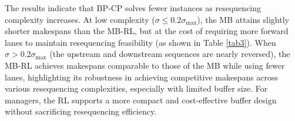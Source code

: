 \documentclass[12pt]{article}
\begin{document}
The results indicate that BP-CP solves fewer instances as resequencing complexity increases. At low complexity ($\sigma\leqslant 0.2\sigma_{\text{max}}$), the MB attains slightly shorter makespans than the MB-RL, but at the cost of requiring more forward lanes to maintain resequencing feasibility (as shown in Table \ref{tab3}). When $\sigma>0.2\sigma_{\text{max}}$ (the upstream and downstream sequences are nearly reversed), the MB-RL achieves makespans comparable to those of the MB while using fewer lanes, highlighting its robustness in achieving competitive makespans across various resequencing complexities, especially with limited buffer size. For managers, the RL supports a more compact and cost-effective buffer design without sacrificing resequencing efficiency.








\end{document}
